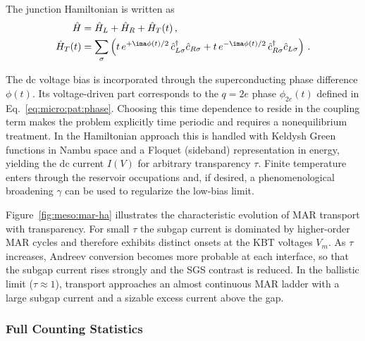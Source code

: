             The junction Hamiltonian is written as
            \begin{align}
                \hat{H} &= \hat{H}_L + \hat{H}_R + \hat{H}_T(t)\,,\\
                \hat{H}_T(t) &= \sum_\sigma \left( t\,e^{+\ima \phi(t)/2}\,\hat{c}^\dagger_{L\sigma}\hat{c}_{R\sigma}
                + t\,e^{-\ima \phi(t)/2}\,\hat{c}^\dagger_{R\sigma}\hat{c}_{L\sigma}\right)\,.
                \label{eq:ha:ht}
            \end{align}

            The dc voltage bias is incorporated through the superconducting phase difference $\phi(t)$. Its voltage-driven part corresponds to the $q=2e$ phase $\phi_{2e}(t)$ defined in Eq.~\eqref{eq:micro:pat:phase}. Choosing this time dependence to reside in the coupling term makes the problem explicitly time periodic and requires a nonequilibrium treatment. In the Hamiltonian approach this is handled with Keldysh Green functions in Nambu space and a Floquet (sideband) representation in energy, yielding the dc current $I(V)$ for arbitrary transparency $\tau$. Finite temperature enters through the reservoir occupations and, if desired, a phenomenological broadening $\gamma$ can be used to regularize the low-bias limit.

            Figure~\ref{fig:meso:mar-ha} illustrates the characteristic evolution of MAR transport with transparency. For small $\tau$ the subgap current is dominated by higher-order MAR cycles and therefore exhibits distinct onsets at the KBT voltages $V_m$. As $\tau$ increases, Andreev conversion becomes more probable at each interface, so that the subgap current rises strongly and the SGS contrast is reduced. In the ballistic limit ($\tau\approx 1$), transport approaches an almost continuous MAR ladder with a large subgap current and a sizable excess current above the gap.

        \subsubsection*{Full Counting Statistics}

